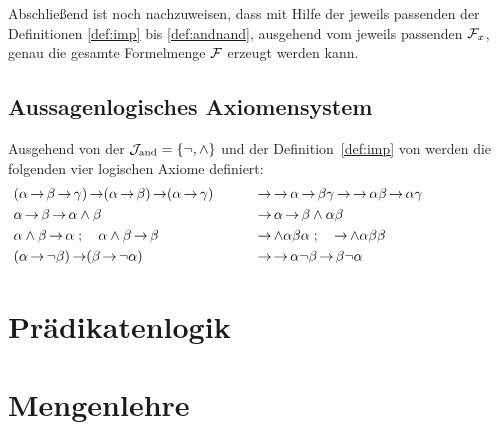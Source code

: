 Abschließend ist noch nachzuweisen, dass mit Hilfe der jeweils passenden der Definitionen \eqref{def:imp} bis \eqref{def:andnand}, ausgehend vom jeweils passenden $\mathcal{F}_x$, genau die gesamte Formelmenge $\mathcal{F}$ erzeugt werden kann.

\subsection{Aussagenlogisches Axiomensystem}%
\label{sub:ausAxiome}

Ausgehend von der  $\mathcal{J}_{\mathrm{and}} = \{\lnot, \land\}$ und der Definition~\vref{def:imp} von \symqt{$\limp$} werden die folgenden vier logischen Axiome definiert:
\begin{align}
	&
	(\alpha\operatorname{\rightarrow}\beta\operatorname{\rightarrow}\gamma)\operatorname{\rightarrow}(\alpha\operatorname{\rightarrow}\beta)\operatorname{\rightarrow}(\alpha\operatorname{\rightarrow}\gamma)
	&&&& &
	& \operatorname{\rightarrow}\operatorname{\rightarrow}\alpha\operatorname{\rightarrow}\beta\gamma\operatorname{\rightarrow}\operatorname{\rightarrow}\alpha\beta\operatorname{\rightarrow}\alpha\gamma \\
	& \alpha \operatorname{\rightarrow} \beta \operatorname{\rightarrow} \alpha \land \beta
	&&&& &
	& \operatorname{\rightarrow} \alpha \operatorname{\rightarrow} \beta \land \alpha \beta \\
	& \alpha \land \beta \operatorname{\rightarrow} \alpha \;; \quad \alpha \land \beta \operatorname{\rightarrow} \beta
	&&&& &
	& \operatorname{\rightarrow} \land \alpha \beta \alpha \;; \quad \operatorname{\rightarrow} \land \alpha \beta \beta\\
	&(\alpha \operatorname{\rightarrow} \lnot \beta) \operatorname{\rightarrow} (\beta \operatorname{\rightarrow} \lnot \alpha)
	&&&& &
	& \operatorname{\rightarrow} \operatorname{\rightarrow} \alpha \lnot \beta \operatorname{\rightarrow} \beta \lnot \alpha
	&&&&&&&&&&
\end{align}


\section{Prädikatenlogik}%
\label{sec:Praedikatenlogik}


\section{Mengenlehre}%
\label{sec:Mengenlehre}


\Endchapter
